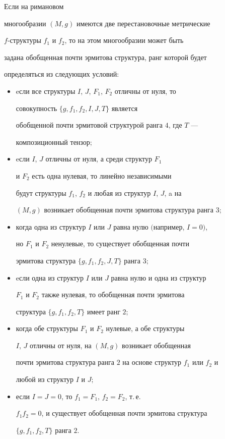 \begin{thm}\label{G}


Если на римановом


многообразии $(M,g)$ имеются две перестановочные метрические


$f$-структуры $f_1$ и $f_2$, то на этом многообразии может быть


задана обобщенная почти эрмитова структура, ранг которой будет


определяться из следующих условий\/${:}$


\begin{itemize}


\item[---] eсли все структуры $I$, $J$, $F_1$, $F_2$ отличны от нуля, то


совокупность $\{g, f_1, f_2, I, J, T\}$ является


обобщенной почти эрмитовой структурой ранга $4$, где $T$ ---


композиционный тензор\/$;$


\item[---] eсли $I$, $J$ отличны от нуля, а среди структур $F_1$


и $F_2$ есть одна нулевая, то линейно независимыми


будут структуры $f_1$, $f_2$ и любая из структур $I$, $J$, a на


$(M,g)$ возникает обобщенная почти эрмитова структура ранга $3;$


\item[---] когда одна из структур $I$ или $J$ равна нулю $($например, $I=0)$,


но $F_1$ и $F_2$ ненулевые, то существует обобщенная почти


эрмитова структура $\{g,f_1,f_2,J,T\}$ ранга $3;$


\item[---] eсли одна из структур $I$ или $J$ равна нулю и одна из структур


$F_1$ и $F_2$ также нулевая, то обобщенная почти эрмитова


структура $\{g,f_1,f_2,T\}$ имеет ранг $2;$


\item[---] когда обе структуры $F_1$ и $F_2$ нулевые, а обе структуры


$I$, $J$ отличны от нуля, на $(M,g)$ возникает обобщенная


почти эрмитова структура ранга $2$ на основе структур $f_1$ или $f_2$ и


любой из структур $I$ и $J;$


\item[---] если $I=J=0$, то $f_1=F_1$, $f_2=F_2$, т.\,е.


$f_1f_2=0$, и существует обобщенная почти эрмитова структура


$\{g,f_1,f_2,T\}$ ранга $2$.


\end{itemize}


\end{thm}





